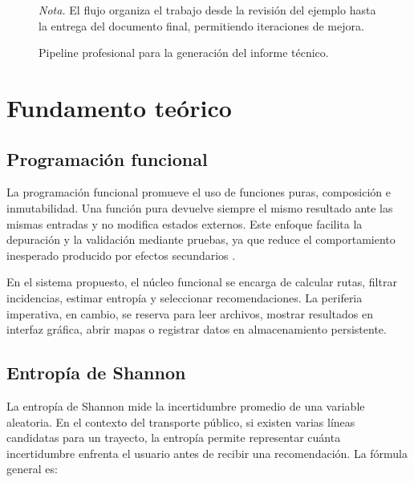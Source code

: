 \documentclass[stu,12pt,floatsintext]{apa7}
\begin{document}
\begin{figure}[H]
\centering
{}
\caption{Pipeline profesional para la generación del informe técnico.}
\par\small\textit{Nota.} El flujo organiza el trabajo desde la revisión del ejemplo hasta la entrega del documento final, permitiendo iteraciones de mejora.
\label{fig:pipeline-informe}
\end{figure}

\section{Fundamento teórico}
\subsection{Programación funcional}
La programación funcional promueve el uso de funciones puras, composición e inmutabilidad. Una función pura devuelve siempre el mismo resultado ante las mismas entradas y no modifica estados externos. Este enfoque facilita la depuración y la validación mediante pruebas, ya que reduce el comportamiento inesperado producido por efectos secundarios \parencite{hughes1989}.

En el sistema propuesto, el núcleo funcional se encarga de calcular rutas, filtrar incidencias, estimar entropía y seleccionar recomendaciones. La periferia imperativa, en cambio, se reserva para leer archivos, mostrar resultados en interfaz gráfica, abrir mapas o registrar datos en almacenamiento persistente.

\subsection{Entropía de Shannon}
La entropía de Shannon mide la incertidumbre promedio de una variable aleatoria. En el contexto del transporte público, si existen varias líneas candidatas para un trayecto, la entropía permite representar cuánta incertidumbre enfrenta el usuario antes de recibir una recomendación. La fórmula general es:
\end{document}
